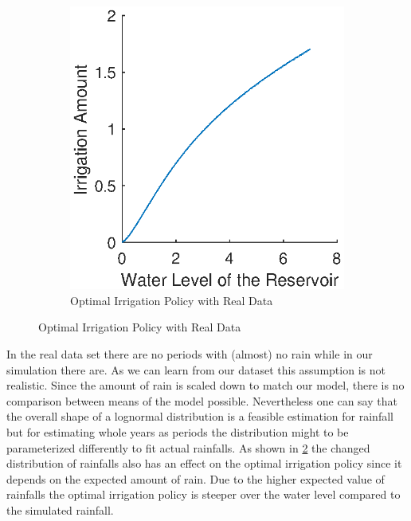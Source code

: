 \documentclass[12pt, a4paper, oneside]{article}
\begin{document}
\begin{figure}[h]
\begin{subfigure}{.5\textwidth}
	\includegraphics[width=1\textwidth]{figures/optimalIrrigationPolicy-real-data.eps}
	\caption{Optimal Irrigation Policy with Real Data}
	\label{fig:optimalIrrigationPolicy-real-data}
\end{subfigure}
\end{figure}
In the real data set there are no periods with (almost) no rain while in our simulation there are.
As we can learn from our dataset this assumption is not realistic.
Since the amount of rain is scaled down to match our model, there is no comparison between means of the model possible.
Nevertheless one can say that the overall shape of a lognormal distribution is a feasible estimation for rainfall but for estimating whole years as periods the distribution might to be parameterized differently to fit actual rainfalls.
As shown in \ref{fig:optimalIrrigationPolicy-real-data} the changed distribution of rainfalls also has an effect on the optimal irrigation policy since it depends on the expected amount of rain.
Due to the higher expected value of rainfalls the optimal irrigation policy is steeper over the water level compared to the simulated rainfall.

\clearpage	
\newpage
\end{document}
